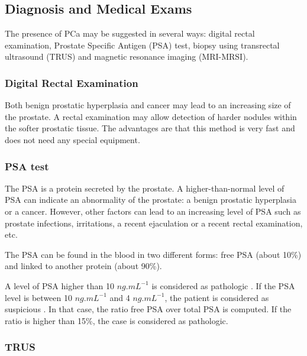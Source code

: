 \subsection{Diagnosis and Medical Exams}\label{subsubsection:intro:prostatecancer:diagnosis}

The presence of PCa may be suggested in several ways: digital rectal examination, Prostate Specific Antigen (PSA\g) test, biopsy using transrectal ultrasound (TRUS\g) and magnetic resonance imaging (MRI\g-MRSI\g).

\subsubsection{Digital Rectal Examination}\label{subsubsection:intro:prostatecancer:diagnosis:rectalexamination}

Both benign prostatic hyperplasia and cancer may lead to an increasing size of the prostate. A rectal examination may allow detection of harder nodules within the softer prostatic tissue. The advantages are that this method is very fast and does not need any special equipment.

\subsubsection{PSA test}\label{subsubsection:intro:prostatecancer:diagnosis:psa}

The PSA is a protein secreted by the prostate. A higher-than-normal level of PSA can indicate an abnormality of the prostate: a benign prostatic hyperplasia or a cancer. However, other factors can lead to an increasing level of PSA such as prostate infections, irritations, a recent ejaculation or a recent rectal examination, etc.

The PSA can be found in the blood in two different forms: free PSA (about 10\%) and linked to another protein (about 90\%).

A level of PSA higher than 10 $ng.mL^{-1}$ is considered as pathologic \cite{Parfait2010}. If the PSA level is between 10 $ng.mL^{-1}$ and 4 $ng.mL^{-1}$, the patient is considered as suspicious \cite{Parfait2010}. In that case, the ratio free PSA over total PSA is computed. If the ratio is higher than 15\%, the case is considered as pathologic.

\subsubsection{TRUS}\label{subsubsection:intro:prostatecancer:diagnosis:trus}

